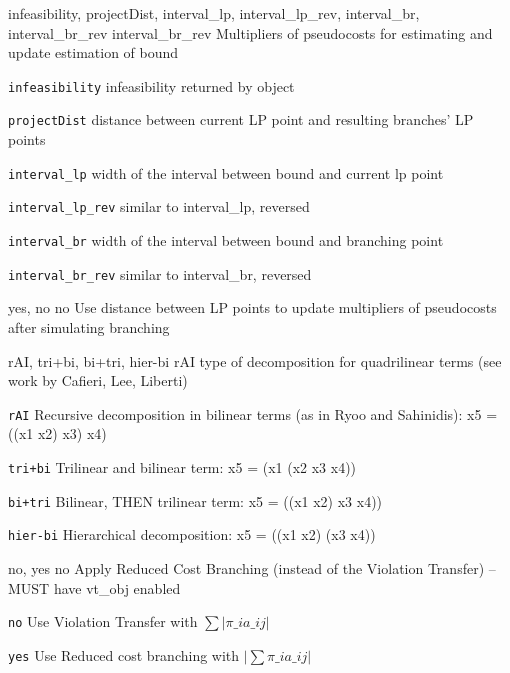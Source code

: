 %
{\ttfamily infeasibility, projectDist, interval\_lp, interval\_lp\_rev, interval\_br, interval\_br\_rev}%
{interval\_br\_rev}%
{Multipliers of pseudocosts for estimating and update estimation of bound}%
{\begin{list}{}{
\setlength{\parsep}{0em}
\setlength{\leftmargin}{5ex}
\setlength{\labelwidth}{2ex}
\setlength{\itemindent}{0ex}
\setlength{\topsep}{0pt}}
\item[\texttt{infeasibility}] infeasibility returned by object
\item[\texttt{projectDist}] distance between current LP point and resulting branches' LP points
\item[\texttt{interval\_lp}] width of the interval between bound and current lp point
\item[\texttt{interval\_lp\_rev}] similar to interval\_lp, reversed
\item[\texttt{interval\_br}] width of the interval between bound and branching point
\item[\texttt{interval\_br\_rev}] similar to interval\_br, reversed
\end{list}
}

%
{\ttfamily yes, no}%
{no}%
{Use distance between LP points to update multipliers of pseudocosts after simulating branching}%
{}

%
{\ttfamily rAI, tri+bi, bi+tri, hier-bi}%
{rAI}%
{type of decomposition for quadrilinear terms (see work by Cafieri, Lee, Liberti)}%
{\begin{list}{}{
\setlength{\parsep}{0em}
\setlength{\leftmargin}{5ex}
\setlength{\labelwidth}{2ex}
\setlength{\itemindent}{0ex}
\setlength{\topsep}{0pt}}
\item[\texttt{rAI}] Recursive decomposition in bilinear terms (as in Ryoo and Sahinidis): x5 = ((x1 x2) x3) x4)
\item[\texttt{tri+bi}] Trilinear and bilinear term: x5 = (x1 (x2 x3 x4))
\item[\texttt{bi+tri}] Bilinear, THEN trilinear term: x5 = ((x1 x2) x3 x4))
\item[\texttt{hier-bi}] Hierarchical decomposition: x5 = ((x1 x2) (x3 x4))
\end{list}
}

%
{\ttfamily no, yes}%
{no}%
{Apply Reduced Cost Branching (instead of the Violation Transfer) -- MUST have vt\_obj enabled}%
{\begin{list}{}{
\setlength{\parsep}{0em}
\setlength{\leftmargin}{5ex}
\setlength{\labelwidth}{2ex}
\setlength{\itemindent}{0ex}
\setlength{\topsep}{0pt}}
\item[\texttt{no}] Use Violation Transfer with $\sum |\pi\_i a\_{ij}|$
\item[\texttt{yes}] Use Reduced cost branching with $|\sum \pi\_i a\_{ij}|$
\end{list}
}

